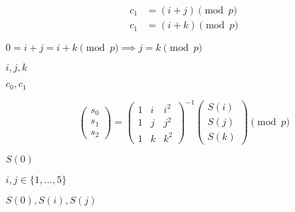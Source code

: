 \documentclass[10pt]{book}
\begin{document}
\begin{mdSnippets}
\begin{mdDisplaySnippet}[3f6da943e2fe15872b25541e32857a99]%
\[%
\begin{aligned}
c_1 &= (i+j) \pmod{p}\\
c_1 &= (i+k) \pmod{p}
\end{aligned}
\]%
\end{mdDisplaySnippet}%
\begin{mdInlineSnippet}[15447f197ddb43630702a2c984f341f5]%
$0 = i+j = i + k  \pmod{p} \implies j = k \pmod{p}$\end{mdInlineSnippet}%
\begin{mdInlineSnippet}[20d172080f660ac3d58312127d2d6a3f]%
$i,j,k$\end{mdInlineSnippet}%
\begin{mdInlineSnippet}%
$c_0,c_1$\end{mdInlineSnippet}%
\begin{mdDisplaySnippet}[359d1939d012452893a1d40e473fc667]%
\[%
\begin{pmatrix}
s_0 \\ s_1 \\ s_2
\end{pmatrix} = \begin{pmatrix} 
1 & i & i^2 \\
1 & j & j^2 \\
1 & k & k^2 
\end{pmatrix}^{-1}
\begin{pmatrix}
S(i)\\S(j)\\ S(k)
\end{pmatrix} \pmod{p}
\]%
\end{mdDisplaySnippet}%
\begin{mdInlineSnippet}%
$S(0)$\end{mdInlineSnippet}%
\begin{mdInlineSnippet}[0576f609c6a5cfad78025f9a454e5798]%
$i,j \in \{1,\ldots,5\}$\end{mdInlineSnippet}%
\begin{mdInlineSnippet}[0641aca8c1cc1bc2060df4309b223899]%
$S(0),S(i),S(j)$\end{mdInlineSnippet}%
\begin{mdInlineSnippet}[ab5d4e293c9e0d46baafcd1b39946a4e]%

\end{mdInlineSnippet}
\end{mdSnippets}
\end{document}
